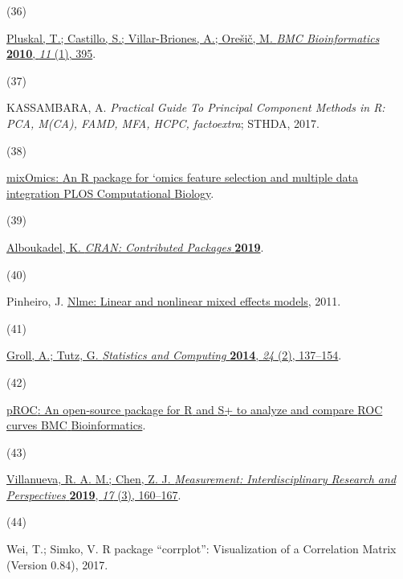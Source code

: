 \documentclass[journal=jacsat,manuscript=article]{achemso}
\newlength{\cslhangindent}
\newlength{\csllabelwidth}
\newenvironment{CSLReferences}[2] %
 {\begin{list}{}{%
  \setlength{\itemindent}{0pt}
  \setlength{\leftmargin}{0pt}
  \setlength{\parsep}{0pt}
  \ifodd #1
   \setlength{\leftmargin}{\cslhangindent}
   \setlength{\itemindent}{-1\cslhangindent}
  \fi
  \setlength{\itemsep}{#2\baselineskip}}}
 {\end{list}}
\newcommand{\CSLLeftMargin}[1]{\parbox[t]{\csllabelwidth}{#1}}
\newcommand{\CSLRightInline}[1]{\parbox[t]{\linewidth - \csllabelwidth}{#1}\break}
\begin{document}
\begin{CSLReferences}{0}{0}
\CSLLeftMargin{(36) }%
\CSLRightInline{\href{https://doi.org/10.1186/1471-2105-11-395}{Pluskal,
T.; Castillo, S.; Villar-Briones, A.; Orešič, M. \emph{BMC
Bioinformatics} \textbf{2010}, \emph{11} (1), 395}.}

\CSLLeftMargin{(37) }%
\CSLRightInline{KASSAMBARA, A. \emph{Practical {Guide} {To} {Principal}
{Component} {Methods} in {R}: {PCA}, {M}({CA}), {FAMD}, {MFA}, {HCPC},
factoextra}; STHDA, 2017.}

\CSLLeftMargin{(38) }%
\CSLRightInline{\href{https://journals.plos.org/ploscompbiol/article?id=10.1371/journal.pcbi.1005752}{{mixOmics}:
{An} {R} package for `omics feature selection and multiple data
integration {\textbar} {PLOS} {Computational} {Biology}}.}

\CSLLeftMargin{(39) }%
\CSLRightInline{\href{https://doi.org/10.32614/cran.package.rstatix}{Alboukadel,
K. \emph{CRAN: Contributed Packages} \textbf{2019}}.}

\CSLLeftMargin{(40) }%
\CSLRightInline{Pinheiro, J.
\href{https://cir.nii.ac.jp/crid/1370861707120203021}{Nlme: {Linear} and
nonlinear mixed effects models}, 2011.}

\CSLLeftMargin{(41) }%
\CSLRightInline{\href{https://doi.org/10.1007/s11222-012-9359-z}{Groll,
A.; Tutz, G. \emph{Statistics and Computing} \textbf{2014}, \emph{24}
(2), 137--154}.}

\CSLLeftMargin{(42) }%
\CSLRightInline{\href{https://link.springer.com/article/10.1186/1471-2105-12-77}{{pROC}:
An open-source package for {R} and {S}+ to analyze and compare {ROC}
curves {\textbar} {BMC} {Bioinformatics}}.}

\CSLLeftMargin{(43) }%
\CSLRightInline{\href{https://doi.org/10.1080/15366367.2019.1565254}{Villanueva,
R. A. M.; Chen, Z. J. \emph{Measurement: Interdisciplinary Research and
Perspectives} \textbf{2019}, \emph{17} (3), 160--167}.}

\CSLLeftMargin{(44) }%
\CSLRightInline{Wei, T.; Simko, V. R package {``corrplot''}:
{Visualization} of a {Correlation} {Matrix} ({Version} 0.84), 2017.}


\end{CSLReferences}
\end{document}
